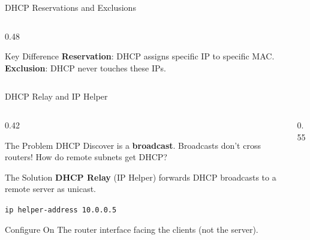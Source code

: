 \documentclass[aspectratio=169, 11pt]{beamer}
\newcommand{\keyterm}[1]{\textbf{\textcolor{rctcblue}{#1}}}
\begin{document}
\begin{frame}{DHCP Reservations and Exclusions}
\begin{columns}[T]
\begin{column}{0.48\textwidth}
            \vspace{0.2em}
            \begin{alertblock}{Key Difference}
                \small
                \textbf{Reservation}: DHCP assigns specific IP to specific MAC. \\
                \textbf{Exclusion}: DHCP never touches these IPs.
            \end{alertblock}
        \end{column}
    \end{columns}
\end{frame}

\begin{frame}{DHCP Relay and IP Helper}
    \begin{columns}[T]
        \begin{column}{0.42\textwidth}
            \begin{block}{The Problem}
                \small
                DHCP Discover is a \textbf{broadcast}. Broadcasts don't cross routers! How do remote subnets get DHCP?
            \end{block}
            
            \vspace{0.2em}
            \begin{block}{The Solution}
                \small
                \keyterm{DHCP Relay} (IP Helper) forwards DHCP broadcasts to a remote server as unicast.
                
                \vspace{0.2em}
                \texttt{ip helper-address 10.0.0.5}
            \end{block}
            
            \vspace{0.2em}
            \begin{alertblock}{Configure On}
                \small
                The router interface facing the clients (not the server).
            \end{alertblock}
        \end{column}
        \begin{column}{0.55\textwidth}
            \begin{center}
\end{center}
\end{column}
\end{columns}
\end{frame}
\end{document}
